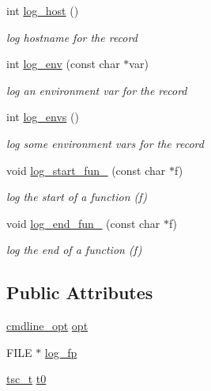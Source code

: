 \begin{DoxyCompactItemize}
\mbox{\label{structlogger_adbbd2917da3496e2e6e04cf17e115133}} 
int \hyperlink{structlogger_adbbd2917da3496e2e6e04cf17e115133}{log\+\_\+host} ()
\begin{DoxyCompactList}\small\item\em log hostname for the record \end{DoxyCompactList}\item 
\mbox{\label{structlogger_a834bbdabbff2c05c342bf3641d6c3966}} 
int \hyperlink{structlogger_a834bbdabbff2c05c342bf3641d6c3966}{log\+\_\+env} (const char $\ast$var)
\begin{DoxyCompactList}\small\item\em log an environment var for the record \end{DoxyCompactList}\item 
\mbox{\label{structlogger_a4de3a6b8949b4155ca57386fd83e1692}} 
int \hyperlink{structlogger_a4de3a6b8949b4155ca57386fd83e1692}{log\+\_\+envs} ()
\begin{DoxyCompactList}\small\item\em log some environment vars for the record \end{DoxyCompactList}\item 
\mbox{\label{structlogger_a88e0dc6e649e35549010eaad9ee713b4}} 
void \hyperlink{structlogger_a88e0dc6e649e35549010eaad9ee713b4}{log\+\_\+start\+\_\+fun\+\_\+} (const char $\ast$f)
\begin{DoxyCompactList}\small\item\em log the start of a function (f) \end{DoxyCompactList}\item 
\mbox{\label{structlogger_a36e263cc78edf7cfc6c2dc172de4ced3}} 
void \hyperlink{structlogger_a36e263cc78edf7cfc6c2dc172de4ced3}{log\+\_\+end\+\_\+fun\+\_\+} (const char $\ast$f)
\begin{DoxyCompactList}\small\item\em log the end of a function (f) \end{DoxyCompactList}\end{DoxyCompactItemize}
\subsection*{Public Attributes}
\begin{DoxyCompactItemize}
\item 
\hyperlink{structcmdline__opt}{cmdline\+\_\+opt} \hyperlink{structlogger_a0e07e1e52c554084e6c3c06476024b9a}{opt}
\item 
F\+I\+LE $\ast$ \hyperlink{structlogger_ab891d941fb5846a3f8678f1db11c0da9}{log\+\_\+fp}
\item 
\hyperlink{structtsc__t}{tsc\+\_\+t} \hyperlink{structlogger_a6336fd3fffff10df04811a819c1c5a70}{t0}
\end{DoxyCompactItemize}


